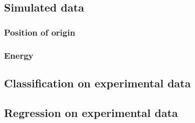 \subsection{Simulated data}
\subsubsection{Position of origin}

\subsubsection{Energy}


\subsection{Classification on experimental data}


\subsection{Regression on experimental data}

